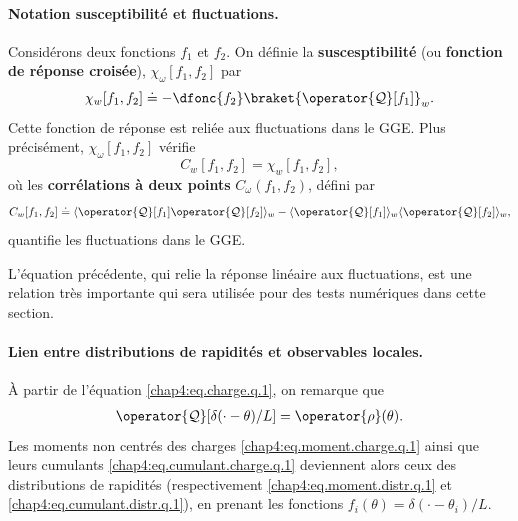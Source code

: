 \medskip

\paragraph{Notation susceptibilité et fluctuations.}

Considérons deux fonctions $f_1$ et $f_2$. On définie la {\bf suscesptibilité} (ou {\bf fonction de réponse croisée}), $\chi_\omega[f_1, f_2]$  par
\begin{equation}\label{chap4:eq.susceptibilite-fonctionnelle_2}
	\chi_w[f_1, f_2] \doteq - \dfonc{f_2}  \braket{\operator{\mathcal{Q}}[f_1]}_w.
\end{equation}
Cette fonction de réponse est reliée aux fluctuations dans le \gls{GGE}. Plus précisément, $\chi_\omega[f_1, f_2]$ vérifie
\begin{equation}\label{chap4:eq.suscep.corre.1}
	C_w[f_1, f_2] = \chi_w[f_1, f_2],
\end{equation}
où les {\bf corrélations à deux points} $C_\omega(f_1, f_2)$, défini par
\begin{equation}\label{chap4:eq.corre.1}
C_w[f_1, f_2] \doteq \langle \operator{\mathcal{Q}}[f_1] \operator{\mathcal{Q}}[f_2] \rangle_w - \langle \operator{\mathcal{Q}}[f_1] \rangle_w \langle \operator{\mathcal{Q}}[f_2] \rangle_w,
\end{equation}
quantifie les fluctuations dans le GGE.

\medskip

L'équation précédente, qui relie la réponse linéaire aux fluctuations, est une relation très importante qui sera utilisée pour des tests numériques dans cette section.

\paragraph{Lien entre distributions de rapidités et observables locales.}

À partir de l’équation \eqref{chap4:eq.charge.q.1}, on remarque que 
\begin{eqnarray}
	\operator{\mathcal{Q}}[\delta(\cdot - \theta)/L] = \operator{\rho}(\theta).
\end{eqnarray}
Les moments non centrés des charges \eqref{chap4:eq.moment.charge.q.1} ainsi que leurs cumulants \eqref{chap4:eq.cumulant.charge.q.1} deviennent alors ceux des distributions de rapidités (respectivement \eqref{chap4:eq.moment.distr.q.1} et \eqref{chap4:eq.cumulant.distr.q.1}), en prenant les fonctions $f_i(\theta) = \delta(\cdot - \theta_i)/L$.\\

